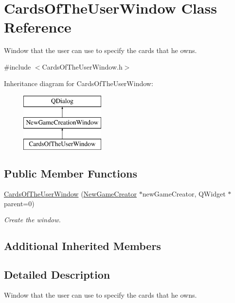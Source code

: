 \hypertarget{classCardsOfTheUserWindow}{}\section{Cards\+Of\+The\+User\+Window Class Reference}
\label{classCardsOfTheUserWindow}


Window that the user can use to specify the cards that he owns.  




{\ttfamily \#include $<$Cards\+Of\+The\+User\+Window.\+h$>$}

Inheritance diagram for Cards\+Of\+The\+User\+Window\+:\begin{figure}[H]
\begin{center}
\leavevmode
\includegraphics[height=3.000000cm]{classCardsOfTheUserWindow}
\end{center}
\end{figure}
\subsection*{Public Member Functions}
\begin{DoxyCompactItemize}
\item 
\hyperlink{classCardsOfTheUserWindow_a2196040b2451a78b75855244f7ab52e2}{Cards\+Of\+The\+User\+Window} (\hyperlink{classNewGameCreator}{New\+Game\+Creator} $\ast$new\+Game\+Creator, Q\+Widget $\ast$parent=0)
\begin{DoxyCompactList}\small\item\em Create the window. \end{DoxyCompactList}\end{DoxyCompactItemize}
\subsection*{Additional Inherited Members}


\subsection{Detailed Description}
Window that the user can use to specify the cards that he owns. 

